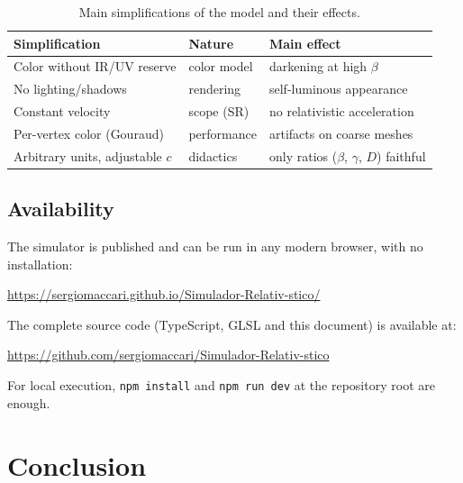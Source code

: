\documentclass[10pt,a4paper,twocolumn]{article}
\begin{document}
\begin{table}[t]
  \centering
  \caption{Main simplifications of the model and their effects.}
  \label{tab:limitacoes}
  \footnotesize
  \setlength{\tabcolsep}{3pt}
  \begin{tabular}{@{}>{\raggedright\arraybackslash}p{}%
                     >{\raggedright\arraybackslash}p{}%
                     >{\raggedright\arraybackslash}p{}@{}}
    \toprule
    Simplification & Nature & Main effect \\
    \midrule
    Color without IR/UV reserve  & color model  & darkening at high $\beta$ \\
    No lighting/shadows          & rendering    & self-luminous appearance \\
    Constant velocity            & scope (SR)   & no relativistic acceleration \\
    Per-vertex color (Gouraud)   & performance  & artifacts on coarse meshes \\
    Arbitrary units, adjustable $c$ & didactics & only ratios ($\beta$, $\gamma$, $D$) faithful \\
    \bottomrule
  \end{tabular}
\end{table}

\subsection{Availability}

The simulator is published and can be run in any modern browser, with no installation:
\begin{center}\small
  \url{https://sergiomaccari.github.io/Simulador-Relativ-stico/}
\end{center}
The complete source code (TypeScript, GLSL and this document) is available at:
\begin{center}\small
  \url{https://github.com/sergiomaccari/Simulador-Relativ-stico}
\end{center}
For local execution, \texttt{npm install} and \texttt{npm run dev} at the repository root
are enough.

\section{Conclusion}
\end{document}
